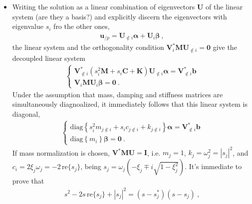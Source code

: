\documentclass[letterpaper,10pt,english]{jupyterBook}
\begin{document}
\begin{itemize}
\item {} 
\sphinxAtStartPar
Writing the solution as a linear combination of eigenvectors \(\mathbf{U}\) of the linear system (are they a basis?) and explicitly discern the eigenvectors with eigenvalue \(s_i\) fro the other ones,
\begin{equation*}
\begin{split}\mathbf{u}_{/p} = \mathbf{U}_{\notin i} \boldsymbol\alpha + \mathbf{U}_i \boldsymbol\beta \ ,\end{split}
\end{equation*}
\sphinxAtStartPar
the linear system and the orthogonality condition \(\mathbf{V}_i^* \mathbf{M} \mathbf{U}_{\notin i} = \mathbf{0}\) give the decoupled linear system
\begin{equation*}
\begin{split}\begin{cases}
    \mathbf{V}^*_{\notin i} \left( s_i^2 \mathbf{M} + s_i \mathbf{C} + \mathbf{K} \right) \mathbf{U}_{\notin i} \boldsymbol\alpha = \mathbf{V}^*_{\notin i} \mathbf{b} \\
    \mathbf{V}_i \mathbf{M} \mathbf{U}_i \boldsymbol\beta = \mathbf{0} \ .
  \end{cases}\end{split}
\end{equation*}
\sphinxAtStartPar
Under the assumption that mass, damping and stiffness matrices are simultaneously diagnoalized, it immediately follows that this linear system is diagonal,
\begin{equation*}
\begin{split}\begin{cases}
    \text{diag} \left\{ s_i^2 m_{j \notin i} + s_i c_{j \notin i} + k_{j\notin i} \right\} \boldsymbol\alpha = \mathbf{V}_{\notin i}^*  \mathbf{b}\\
    \text{diag} \left\{ m_i \right\} \boldsymbol\beta = \mathbf{0} \ .
  \end{cases}\end{split}
\end{equation*}
\sphinxAtStartPar
If mass normalization is chosen, \(\mathbf{V}^* \mathbf{M} \mathbf{U} = \mathbf{I}\), i.e. \(m_j = 1\), \(k_j = \omega_j^2 = |s_j|^2\), and \(c_i = 2 \xi_j \omega_j = - 2 \, \text{re}\{ s_j \}\), being \(s_j = \omega_j \left( - \xi_j \mp i \sqrt{ 1 - \xi^2_j } \right)\). It’s immediate to prove that
\begin{equation*}
\begin{split}s^2 - 2 s \, \text{re}\{ s_j \} + |s_j|^2 = ( s - s_j^* ) ( s - s_j ) \ ,\end{split}

\end{equation*}
\end{itemize}
\end{document}
